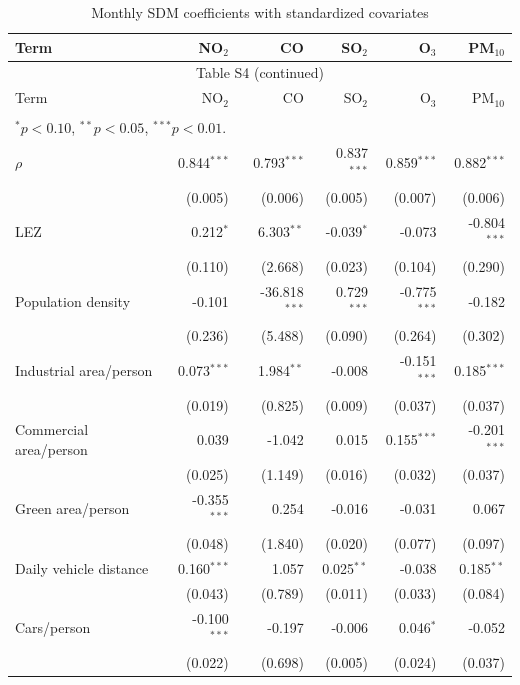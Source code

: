 \begin{longtable}{lrrrrr}
\caption{Monthly SDM coefficients with standardized covariates}\label{tab:s_coefficients}\\
\toprule
Term & NO$_2$ & CO & SO$_2$ & O$_3$ & PM$_{10}$ \\
\midrule\endfirsthead
\multicolumn{6}{c}{Table S4 (continued)}\\
\toprule
Term & NO$_2$ & CO & SO$_2$ & O$_3$ & PM$_{10}$ \\
\midrule\endhead
\bottomrule
\endfoot
\bottomrule
\multicolumn{6}{l}{\footnotesize HAC(12) standard errors in parentheses.} \\
\multicolumn{6}{l}{\footnotesize $^{*}p<0.10$, $^{**}p<0.05$, $^{***}p<0.01$.} \\
\endlastfoot
$\rho$ & 0.844$^{***}$ & 0.793$^{***}$ & 0.837$^{***}$ & 0.859$^{***}$ & 0.882$^{***}$ \\
 & (0.005) & (0.006) & (0.005) & (0.007) & (0.006) \\
\addlinespace[1pt]
LEZ & 0.212$^{*}$ & 6.303$^{**}$ & -0.039$^{*}$ & -0.073 & -0.804$^{***}$ \\
 & (0.110) & (2.668) & (0.023) & (0.104) & (0.290) \\
\addlinespace[1pt]
Population density & -0.101 & -36.818$^{***}$ & 0.729$^{***}$ & -0.775$^{***}$ & -0.182 \\
 & (0.236) & (5.488) & (0.090) & (0.264) & (0.302) \\
\addlinespace[1pt]
Industrial area/person & 0.073$^{***}$ & 1.984$^{**}$ & -0.008 & -0.151$^{***}$ & 0.185$^{***}$ \\
 & (0.019) & (0.825) & (0.009) & (0.037) & (0.037) \\
\addlinespace[1pt]
Commercial area/person & 0.039 & -1.042 & 0.015 & 0.155$^{***}$ & -0.201$^{***}$ \\
 & (0.025) & (1.149) & (0.016) & (0.032) & (0.037) \\
\addlinespace[1pt]
Green area/person & -0.355$^{***}$ & 0.254 & -0.016 & -0.031 & 0.067 \\
 & (0.048) & (1.840) & (0.020) & (0.077) & (0.097) \\
\addlinespace[1pt]
Daily vehicle distance & 0.160$^{***}$ & 1.057 & 0.025$^{**}$ & -0.038 & 0.185$^{**}$ \\
 & (0.043) & (0.789) & (0.011) & (0.033) & (0.084) \\
\addlinespace[1pt]
Cars/person & -0.100$^{***}$ & -0.197 & -0.006 & 0.046$^{*}$ & -0.052 \\
 & (0.022) & (0.698) & (0.005) & (0.024) & (0.037) \\

\end{longtable}
